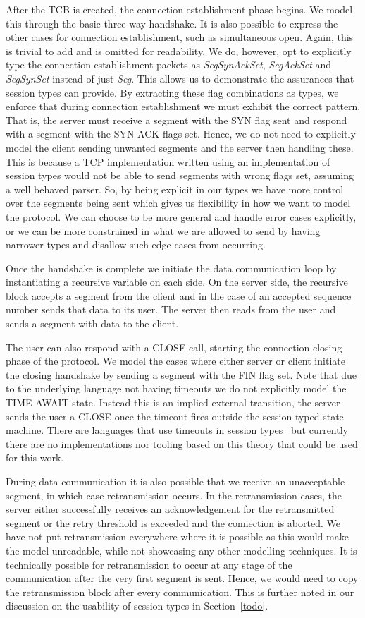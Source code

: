After the TCB is created, the connection establishment phase begins.
We model this through the basic three-way handshake.
It is also possible to express the other cases for connection establishment, such as simultaneous open.
Again, this is trivial to add and is omitted for readability.
We do, however, opt to explicitly type the connection establishment packets as \textit{SegSynAckSet}, \textit{SegAckSet} and \textit{SegSynSet} instead of just \textit{Seg}.
This allows us to demonstrate the assurances that session types can provide.
By extracting these flag combinations as types, we enforce that during connection establishment we must exhibit the correct pattern.
That is, the server must receive a segment with the SYN flag sent and respond with a segment with the SYN-ACK flags set.
Hence, we do not need to explicitly model the client sending unwanted segments and the server then handling these.
This is because a TCP implementation written using an implementation of session types would not be able to send segments with wrong flags set, assuming a well behaved parser.
So, by being explicit in our types we have more control over the segments being sent which gives us flexibility in how we want to model the protocol.
We can choose to be more general and handle error cases explicitly, or we can be more constrained in what we are allowed to send by having narrower types and disallow such edge-cases from occurring.

Once the handshake is complete we initiate the data communication loop by instantiating a recursive variable on each side.
On the server side, the recursive block accepts a segment from the client and in the case of an accepted sequence number sends that data to its user.
The server then reads from the user and sends a segment with data to the client.

The user can also respond with a CLOSE call, starting the connection closing phase of the protocol.
We model the cases where either server or client initiate the closing handshake by sending a segment with the FIN flag set.
Note that due to the underlying language not having timeouts we do not explicitly model the TIME-AWAIT state.
Instead this is an implied external transition, the server sends the user a CLOSE once the timeout fires outside the session typed state machine.
There are languages that use timeouts in session types~\cite{todo} but currently there are no implementations nor tooling based on this theory that could be used for this work.

During data communication it is also possible that we receive an unacceptable segment, in which case retransmission occurs.
In the retransmission cases, the server either successfully receives an acknowledgement for the retransmitted segment or the retry threshold is exceeded and the connection is aborted.
We have not put retransmission everywhere where it is possible as this would make the model unreadable, while not showcasing any other modelling techniques.
It is technically possible for retransmission to occur at any stage of the communication after the very first segment is sent.
Hence, we would need to copy the retransmission block after every communication.
This is further noted in our discussion on the usability of session types in Section~\ref{todo}.

